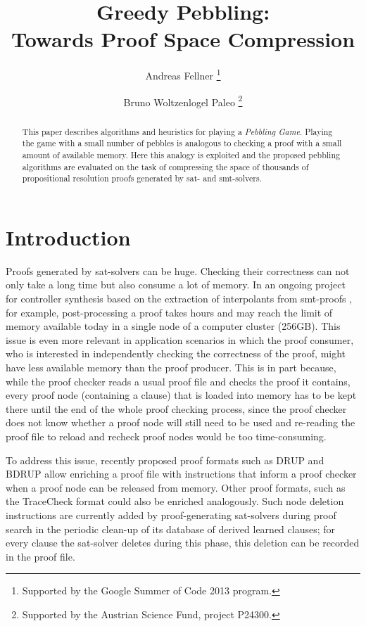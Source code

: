 \documentclass{llncs}
\title{Greedy Pebbling: \\ 
Towards Proof Space Compression}
\author{
  Andreas Fellner 
  \thanks{Supported by the Google Summer of Code 2013 program.}
  \and 
  Bruno Woltzenlogel Paleo 
  \thanks{Supported by the Austrian Science Fund, project P24300.}
}
\institute{
  \email{fellner.a@gmail.com} \ \ \ \email{bruno@logic.at} \\
  Theory and Logic Group \\
  Institute for Computer Languages \\
  Vienna University of Technology
}
\begin{document}
\maketitle

\begin{abstract}
This paper describes algorithms and heuristics for playing a \emph{Pebbling Game}. Playing the game with a small number of pebbles is analogous to checking a proof with a small amount of available memory. Here this analogy is exploited and the proposed pebbling algorithms are evaluated on the task of compressing the space of thousands of propositional resolution proofs generated by sat- and smt-solvers.
\end{abstract}

\setcounter{footnote}{0}


\section{Introduction}

Proofs generated by sat-solvers can be huge. 
Checking their correctness can not only take a long time but also consume a lot of memory. 
In an ongoing project for controller synthesis based on the extraction of interpolants from smt-proofs \cite{ToDo:GeorgHofferek}, 
for example, post-processing a proof takes hours and may reach the limit of memory available today in a single node of a computer cluster (256GB). This issue is even more relevant in application scenarios in which the proof consumer, who is interested in independently checking the correctness of the proof, might have less available memory than the proof producer.
This is in part because, while the proof checker reads a usual proof file and checks the proof it contains, 
every proof node (containing a clause) that is loaded into memory has to be kept there until the end of the whole proof checking process, 
since the proof checker does not know whether a proof node will still need to be used and re-reading the proof file to reload and recheck proof nodes would be too time-consuming. 

To address this issue, recently proposed proof formats such as DRUP and BDRUP \cite{ToDo:AllenVanGelder,ToDo:MarijnHeule} allow enriching a proof file with instructions that inform a proof checker when a proof node can be released from memory. Other proof formats, such as the TraceCheck format \cite{ToDo} could also be enriched analogously. Such node deletion instructions are currently added by proof-generating sat-solvers during proof search in the periodic clean-up of its database of derived learned clauses; for every clause the sat-solver deletes during this phase, this deletion can be recorded in the proof file. 
\end{document}
